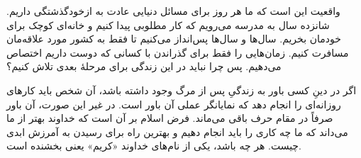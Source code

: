 واقعیت این است که ما هر روز برای مسائل دنیایی عادت به ازخودگذشتگی داریم. شانزده سال به مدرسه می‌رویم که کار مطلوبی پیدا کنیم و خانه‌ای کوچک برای خودمان بخریم. سال‌ها و سال‌ها پس‌انداز می‌کنیم تا فقط به کشور مورد علاقه‌مان مسافرت کنیم. زمان‌هایی را فقط برای گذراندن با کسانی که دوست داریم اختصاص می‌دهیم. پس چرا نباید  در این زندگی برای مرحلهٔ بعدی تلاش کنیم؟

اگر در دینِ کسی باور به زندگیِ پس از مرگ وجود داشته باشد، آن شخص باید کارهای روزانه‌ای را انجام دهد که نمایانگر عملی آن باور است. در غیر این صورت، آن باور صرفاً در مقام حرف باقی می‌ماند. فرض اسلام بر آن است که خداوند بهتر از ما می‌داند که ما  چه کاری را باید انجام دهیم و بهترین راه برای رسیدن به آمرزش ابدی چیست. هر چه باشد، یکی از نام‌های خداوند «کریم» یعنی بخشنده است.  






